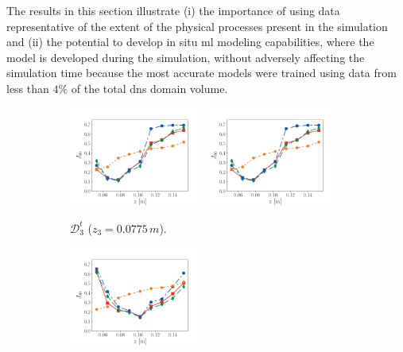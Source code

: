 \documentclass[review]{elsarticle}
\begin{document}
The results in this section illustrate (i) the importance of using
data representative of the extent of the physical processes present in
the simulation and (ii) the potential to develop in situ \gls{ml}
modeling capabilities, where the model is developed during the
simulation, without adversely affecting the simulation time because
the most accurate models were trained using data from less than $4\%$
of the total \gls{dns} domain volume.

\begin{figure}[!tbp]%
  \centering%
  \begin{subfigure}[t]{\textwidth}%
    \includegraphics[page=1,width=0.48\textwidth, trim=0.2cm 0cm 1cm 1cm, clip=true]{./figs/dice_predictions_0004.pdf}\hfill%
    \includegraphics[page=2,width=0.48\textwidth, trim=0.2cm 0cm 1cm 1cm, clip=true]{./figs/dice_predictions_0004.pdf}%
    \caption{$\mathcal{D}_3^t$ ($z_3=0.0775\,\unit{m}$).}\label{fig:gen_3}%
  \end{subfigure}\hfill%
  \begin{subfigure}[t]{\textwidth}%
    \includegraphics[page=1,width=0.48\textwidth, trim=0.2cm 0cm 1cm 1cm, clip=true]{./figs/dice_predictions_0006.pdf}\hfill%

\end{subfigure}
\end{figure}
\end{document}
